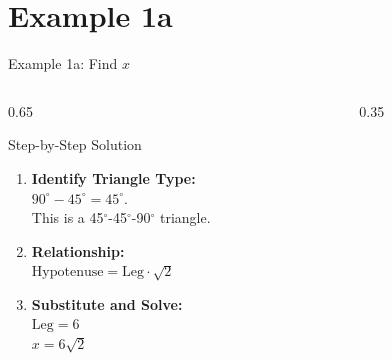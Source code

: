 \documentclass[10pt]{beamer}
\begin{document}
\section{Example 1a}
\begin{frame}{Example 1a: Find $x$}
    \begin{columns}[T] %
        \begin{column}{0.65\textwidth}
            \begin{block}{Step-by-Step Solution}
                \begin{enumerate}
                    \item<1-> \textbf{Identify Triangle Type:} \\
                    $90^\circ - 45^\circ = 45^\circ$. \\
                    This is a 45$^\circ$-45$^\circ$-90$^\circ$ triangle.
                    
                    \item<2-> \textbf{Relationship:} \\
                    $\text{Hypotenuse} = \text{Leg} \cdot \sqrt{2}$
                    
                    \item<3-> \textbf{Substitute and Solve:} \\
                    $\text{Leg} = 6$ \\
                    $x = 6\sqrt{2}$
                \end{enumerate}
            \end{block}
        \end{column}

        \begin{column}{0.35\textwidth}
            \centering
            \vspace{0.2cm}
        \end{column}
    \end{columns}
\end{frame}
\end{document}
